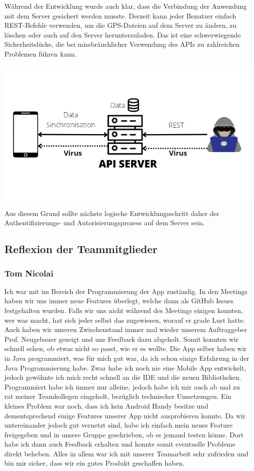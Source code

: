 \documentclass[10pt]{article}
\begin{document}
    Während der Entwicklung wurde auch klar, dass die Verbindung der
    Anwendung mit dem Server gesichert werden musste. Derzeit kann jeder Benutzer einfach REST-Befehle verwenden, 
    um die GPS-Dateien auf dem Server zu ändern, zu löschen oder auch auf den Server
    herunterzuladen. Das ist eine schwerwiegende Sicherheitslücke, die bei missbräuchlicher Verwendung des APIs zu zahlreichen Problemen führen kann.
    \begin{center}
        \includegraphics[scale=0.4]{virus.png}
    \end{center}
    Aus diesem Grund sollte nächste logische Entwicklungsschritt
    daher der Authentifizierungs- und Autorisierungsprozess auf dem Server sein.
\subsection{Reflexion der Teammitglieder}
\subsubsection{Tom Nicolai}
    Ich war mit im Bereich der Programmierung der App zuständig. In den Meetings haben wir uns immer neue Features überlegt, 
    welche dann als GitHub Issues festgehalten wurden. Falls wir uns nicht während des Meetings einigen konnten, wer was macht, 
    hat sich jeder selbst das zugewiesen, worauf er grade Lust hatte. Auch haben wir unseren Zwischenstand immer mal wieder unserem 
    Auftraggeber Prof. Neugebauer gezeigt und uns Feedback dazu abgeholt. Somit konnten wir schnell sehen, ob etwas nicht so passt, 
    wie er es wollte. Die App selber haben wir in Java programmiert, was für mich gut war, da ich schon einige Erfahrung 
    in der Java Programmierung habe. Zwar habe ich noch nie eine Mobile App entwickelt, jedoch gewöhnte ich mich recht schnell 
    an die IDE und die neuen Bibliotheken. Programmiert habe ich immer nur alleine, jedoch habe ich mir auch ab und zu rat meiner 
    Teamkollegen eingeholt, bezüglich technischer Umsetzungen. Ein kleines Problem war noch, dass ich kein Android Handy besitze 
    und dementsprechend einige Features unserer App nicht ausprobieren konnte. Da wir untereinander jedoch gut vernetzt sind, 
    habe ich einfach mein neues Feature freigegeben und in unsere Gruppe geschrieben, ob es jemand testen könne. 
    Dort habe ich dann auch Feedback erhalten und konnte somit eventuelle Probleme direkt beheben. Alles in allem 
    war ich mit unserer Teamarbeit sehr zufrieden und bin mir sicher, dass wir ein gutes Produkt geschaffen haben.
\end{document}
